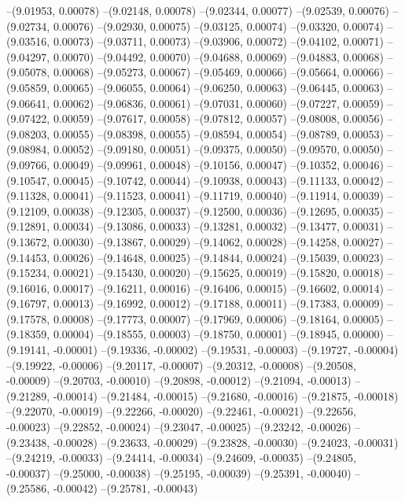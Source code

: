 --(9.01953, 0.00078)
--(9.02148, 0.00078)
--(9.02344, 0.00077)
--(9.02539, 0.00076)
--(9.02734, 0.00076)
--(9.02930, 0.00075)
--(9.03125, 0.00074)
--(9.03320, 0.00074)
--(9.03516, 0.00073)
--(9.03711, 0.00073)
--(9.03906, 0.00072)
--(9.04102, 0.00071)
--(9.04297, 0.00070)
--(9.04492, 0.00070)
--(9.04688, 0.00069)
--(9.04883, 0.00068)
--(9.05078, 0.00068)
--(9.05273, 0.00067)
--(9.05469, 0.00066)
--(9.05664, 0.00066)
--(9.05859, 0.00065)
--(9.06055, 0.00064)
--(9.06250, 0.00063)
--(9.06445, 0.00063)
--(9.06641, 0.00062)
--(9.06836, 0.00061)
--(9.07031, 0.00060)
--(9.07227, 0.00059)
--(9.07422, 0.00059)
--(9.07617, 0.00058)
--(9.07812, 0.00057)
--(9.08008, 0.00056)
--(9.08203, 0.00055)
--(9.08398, 0.00055)
--(9.08594, 0.00054)
--(9.08789, 0.00053)
--(9.08984, 0.00052)
--(9.09180, 0.00051)
--(9.09375, 0.00050)
--(9.09570, 0.00050)
--(9.09766, 0.00049)
--(9.09961, 0.00048)
--(9.10156, 0.00047)
--(9.10352, 0.00046)
--(9.10547, 0.00045)
--(9.10742, 0.00044)
--(9.10938, 0.00043)
--(9.11133, 0.00042)
--(9.11328, 0.00041)
--(9.11523, 0.00041)
--(9.11719, 0.00040)
--(9.11914, 0.00039)
--(9.12109, 0.00038)
--(9.12305, 0.00037)
--(9.12500, 0.00036)
--(9.12695, 0.00035)
--(9.12891, 0.00034)
--(9.13086, 0.00033)
--(9.13281, 0.00032)
--(9.13477, 0.00031)
--(9.13672, 0.00030)
--(9.13867, 0.00029)
--(9.14062, 0.00028)
--(9.14258, 0.00027)
--(9.14453, 0.00026)
--(9.14648, 0.00025)
--(9.14844, 0.00024)
--(9.15039, 0.00023)
--(9.15234, 0.00021)
--(9.15430, 0.00020)
--(9.15625, 0.00019)
--(9.15820, 0.00018)
--(9.16016, 0.00017)
--(9.16211, 0.00016)
--(9.16406, 0.00015)
--(9.16602, 0.00014)
--(9.16797, 0.00013)
--(9.16992, 0.00012)
--(9.17188, 0.00011)
--(9.17383, 0.00009)
--(9.17578, 0.00008)
--(9.17773, 0.00007)
--(9.17969, 0.00006)
--(9.18164, 0.00005)
--(9.18359, 0.00004)
--(9.18555, 0.00003)
--(9.18750, 0.00001)
--(9.18945, 0.00000)
--(9.19141, -0.00001)
--(9.19336, -0.00002)
--(9.19531, -0.00003)
--(9.19727, -0.00004)
--(9.19922, -0.00006)
--(9.20117, -0.00007)
--(9.20312, -0.00008)
--(9.20508, -0.00009)
--(9.20703, -0.00010)
--(9.20898, -0.00012)
--(9.21094, -0.00013)
--(9.21289, -0.00014)
--(9.21484, -0.00015)
--(9.21680, -0.00016)
--(9.21875, -0.00018)
--(9.22070, -0.00019)
--(9.22266, -0.00020)
--(9.22461, -0.00021)
--(9.22656, -0.00023)
--(9.22852, -0.00024)
--(9.23047, -0.00025)
--(9.23242, -0.00026)
--(9.23438, -0.00028)
--(9.23633, -0.00029)
--(9.23828, -0.00030)
--(9.24023, -0.00031)
--(9.24219, -0.00033)
--(9.24414, -0.00034)
--(9.24609, -0.00035)
--(9.24805, -0.00037)
--(9.25000, -0.00038)
--(9.25195, -0.00039)
--(9.25391, -0.00040)
--(9.25586, -0.00042)
--(9.25781, -0.00043)
